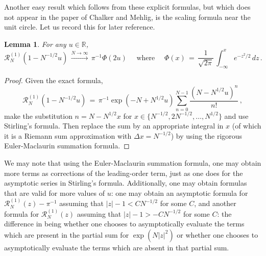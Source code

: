 \documentclass[12pt]{report}
\newtheorem{lemma}[theorem]{Lemma}
\newcommand{\R}{\mathbb{R}}
\newcommand{\be}{\begin{equation}}
\newcommand{\ee}{\end{equation}}
\theoremstyle{definition}
\begin{document}
Another easy result which follows from these explicit formulas, but which does not appear in the paper of Chalker and Mehlig, is the scaling formula
near the unit circle. Let us record this for later reference.
\begin{lemma} \label{lem:circle}
 For any $u \in \R$,
\be
\mathcal{R}_N^{(1)}(1-N^{-1/2}u)\, \stackrel{N\to\infty}{\longrightarrow}\, \pi^{-1} \Phi(2u)\quad 
\text{ where }\quad
\Phi(x)\, =\, \frac{1}{\sqrt{2\pi}}\, \int_{-\infty}^{x} e^{-z^2/2}\, dz\, .
\ee
\end{lemma}
\begin{proof}
Given the exact formula,
\be
\mathcal{R}_N^{(1)}(1-N^{-1/2}u)\, =\, \pi^{-1} \exp(-N+N^{1/2}u) \sum_{n=0}^{N-1} \frac{(N-N^{1/2}u)^n}{n!}\, ,
\ee
make the substitution $n=N-N^{1/2}x$ for $x \in \{N^{-1/2},2N^{-1/2},\dots,N^{1/2}\}$ and use Stirling's formula.
Then replace the sum by an appropriate integral in $x$ (of which it is a Riemann sum approximation with $\Delta x=N^{-1/2}$) by using the rigorous Euler-Maclaurin
summation formula.
\end{proof}
We may note that using the Euler-Maclaurin summation formula, one may obtain more terms as corrections of the leading-order term, just as one does
for the asymptotic series in Stirling's formula. Additionally, one may obtain formulas that are valid for more values of $u$:
one may obtain an asymptotic formula for $\mathcal{R}_N^{(1)}(z)-\pi^{-1}$ assuming that $|z|-1<CN^{-1/2}$ for some $C$, and another formula for $\mathcal{R}_N^{(1)}(z)$
assuming that $|z|-1>-CN^{-1/2}$ for some $C$: the difference in being whether one chooses to asymptotically evaluate the terms which are present in the partial sum for $\exp(N|z|^2)$
or whether one chooses to asymptotically evaluate the terms which are absent in that partial sum.
\end{document}
